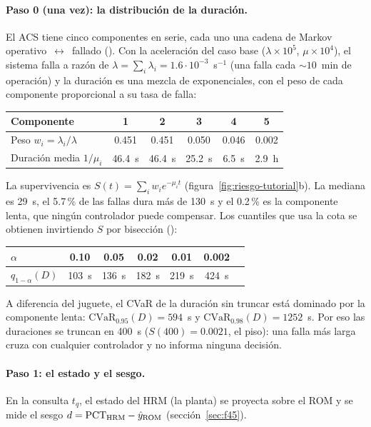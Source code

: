 \paragraph{Paso 0 (una vez): la distribución de la duración.} El ACS tiene cinco componentes en
serie, cada uno una cadena de Markov operativo~$\leftrightarrow$~fallado
(). Con la aceleración del caso base
($\lambda\times10^5$, $\mu\times10^4$), el sistema falla a razón de
$\lambda=\sum_i\lambda_i=1.6\cdot10^{-3}$~s$^{-1}$ (una falla cada $\sim10$~min de operación) y la
duración es una mezcla de exponenciales, con el peso de cada componente proporcional a su tasa de
falla:
\begin{center}\small
\begin{tabular}{@{}lccccc@{}}\toprule
Componente & 1 & 2 & 3 & 4 & 5\\\midrule
Peso $w_i=\lambda_i/\lambda$ & 0.451 & 0.451 & 0.050 & 0.046 & 0.002\\
Duración media $1/\mu_i$ & 46.4~s & 46.4~s & 25.2~s & 6.5~s & 2.9~h\\\bottomrule
\end{tabular}
\end{center}
La supervivencia es $S(t)=\sum_iw_ie^{-\mu_it}$ (figura~\ref{fig:riesgo-tutorial}b). La mediana es
29~s, el 5.7\,\% de las fallas dura más de 130~s y el 0.2\,\% es la componente lenta, que ningún
controlador puede compensar. Los cuantiles que usa la cota se obtienen invirtiendo $S$ por
bisección ():
\begin{center}\small
\begin{tabular}{@{}lcccccc@{}}\toprule
$\alpha$ & 0.10 & 0.05 & 0.02 & 0.01 & 0.002\\\midrule
$q_{1-\alpha}(D)$ & 103~s & 136~s & 182~s & 219~s & 424~s\\\bottomrule
\end{tabular}
\end{center}
A diferencia del juguete, el CVaR de la duración sin truncar está dominado por la componente
lenta: $\mathrm{CVaR}_{0.95}(D)=594$~s y $\mathrm{CVaR}_{0.98}(D)=1252$~s. Por eso las duraciones
se truncan en 400~s ($S(400)=0.0021$, el piso): una falla más larga cruza con cualquier
controlador y no informa ninguna decisión.

\paragraph{Paso 1: el estado y el sesgo.} En la consulta $t_q$, el estado del HRM (la planta) se
proyecta sobre el ROM y se mide el sesgo $d=\mathrm{PCT}_{\rm HRM}-\hat y_{\rm ROM}$
(sección~\ref{sec:f45}).


